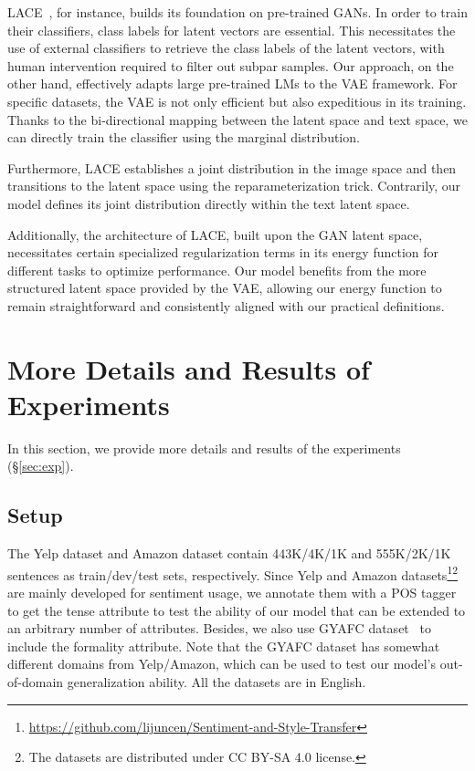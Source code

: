 \documentclass[11pt]{article}
\begin{document}
LACE~\citep{nie2021controllable}, for instance, builds its foundation on pre-trained GANs. In order to train their classifiers, class labels for latent vectors are essential. This necessitates the use of external classifiers to retrieve the class labels of the latent vectors, with human intervention required to filter out subpar samples. Our approach, on the other hand, effectively adapts large pre-trained LMs to the VAE framework. For specific datasets, the VAE is not only efficient but also expeditious in its training. Thanks to the bi-directional mapping between the latent space and text space, we can directly train the classifier using the marginal distribution.

Furthermore, LACE establishes a joint distribution in the image space and then transitions to the latent space using the reparameterization trick. Contrarily, our model defines its joint distribution directly within the text latent space.

Additionally, the architecture of LACE, built upon the GAN latent space, necessitates certain specialized regularization terms in its energy function for different tasks to optimize performance. Our model benefits from the more structured latent space provided by the VAE, allowing our energy function to remain straightforward and consistently aligned with our practical definitions.

\section{More Details and Results of Experiments}
In this section, we provide more details and results of the experiments (\S\ref{sec:exp}).
\subsection{Setup}
\label{app:setup}
The Yelp dataset and Amazon dataset contain 443K/4K/1K and 555K/2K/1K sentences as train/dev/test sets, respectively.
Since Yelp and Amazon datasets\footnote{\url{https://github.com/lijuncen/Sentiment-and-Style-Transfer}}\footnote{The datasets are distributed under CC BY-SA 4.0 license.} are mainly developed for sentiment usage, we annotate them with a POS tagger to get the tense attribute
to test the ability of our model that can be extended to an arbitrary number of attributes. 
Besides, we also use GYAFC dataset~\cite{DBLP:conf/naacl/RaoT18} to include the formality attribute. Note that the GYAFC dataset
has somewhat different domains from Yelp/Amazon, which can be used to test our model's out-of-domain generalization ability. All the datasets are in English.
\end{document}
